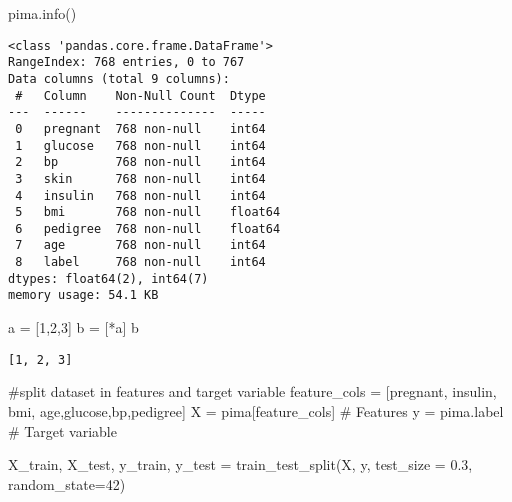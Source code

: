 \documentclass[
  letterpaper,
  DIV=11,
  numbers=noendperiod]{scrreprt}
\newenvironment{Shaded}{\begin{snugshade}}{\end{snugshade}}
\newcommand{\CommentTok}[1]{\textcolor[rgb]{0.37,0.37,0.37}{#1}}
\newcommand{\DecValTok}[1]{\textcolor[rgb]{0.68,0.00,0.00}{#1}}
\newcommand{\FloatTok}[1]{\textcolor[rgb]{0.68,0.00,0.00}{#1}}
\newcommand{\NormalTok}[1]{\textcolor[rgb]{0.00,0.23,0.31}{#1}}
\newcommand{\OperatorTok}[1]{\textcolor[rgb]{0.37,0.37,0.37}{#1}}
\newcommand{\StringTok}[1]{\textcolor[rgb]{0.13,0.47,0.30}{#1}}
\begin{document}
\begin{Shaded}
\begin{Highlighting}[]
\NormalTok{pima.info()}
\end{Highlighting}
\end{Shaded}

\begin{verbatim}
<class 'pandas.core.frame.DataFrame'>
RangeIndex: 768 entries, 0 to 767
Data columns (total 9 columns):
 #   Column    Non-Null Count  Dtype  
---  ------    --------------  -----  
 0   pregnant  768 non-null    int64  
 1   glucose   768 non-null    int64  
 2   bp        768 non-null    int64  
 3   skin      768 non-null    int64  
 4   insulin   768 non-null    int64  
 5   bmi       768 non-null    float64
 6   pedigree  768 non-null    float64
 7   age       768 non-null    int64  
 8   label     768 non-null    int64  
dtypes: float64(2), int64(7)
memory usage: 54.1 KB
\end{verbatim}

\begin{Shaded}
\begin{Highlighting}[]
\NormalTok{a }\OperatorTok{=}\NormalTok{ [}\DecValTok{1}\NormalTok{,}\DecValTok{2}\NormalTok{,}\DecValTok{3}\NormalTok{]}
\NormalTok{b }\OperatorTok{=}\NormalTok{ [}\OperatorTok{*}\NormalTok{a]}
\NormalTok{b}
\end{Highlighting}
\end{Shaded}

\begin{verbatim}
[1, 2, 3]
\end{verbatim}

\begin{Shaded}
\begin{Highlighting}[]
\CommentTok{\#split dataset in features and target variable}
\NormalTok{feature\_cols }\OperatorTok{=}\NormalTok{ [}\StringTok{\textquotesingle{}pregnant\textquotesingle{}}\NormalTok{, }\StringTok{\textquotesingle{}insulin\textquotesingle{}}\NormalTok{, }\StringTok{\textquotesingle{}bmi\textquotesingle{}}\NormalTok{, }\StringTok{\textquotesingle{}age\textquotesingle{}}\NormalTok{,}\StringTok{\textquotesingle{}glucose\textquotesingle{}}\NormalTok{,}\StringTok{\textquotesingle{}bp\textquotesingle{}}\NormalTok{,}\StringTok{\textquotesingle{}pedigree\textquotesingle{}}\NormalTok{]}
\NormalTok{X }\OperatorTok{=}\NormalTok{ pima[feature\_cols] }\CommentTok{\# Features}
\NormalTok{y }\OperatorTok{=}\NormalTok{ pima.label }\CommentTok{\# Target variable}

\NormalTok{X\_train, X\_test, y\_train, y\_test }\OperatorTok{=}\NormalTok{ train\_test\_split(X, y, test\_size }\OperatorTok{=} \FloatTok{0.3}\NormalTok{, random\_state}\OperatorTok{=}\DecValTok{42}\NormalTok{)}
\end{Highlighting}
\end{Shaded}
\end{document}
